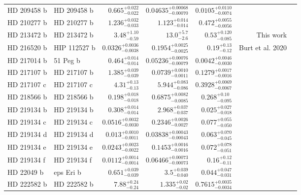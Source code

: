 \begin{longtable*}{llrrrrr}
HD 209458 b & HD 209458 b & $0.665^{+0.022}_{-0.022}$ & $0.04635^{+0.00068}_{-0.00070}$ & $0.0105^{+0.0110}_{-0.0074}$ & \cite{Henry00} & \\
HD 210277 b & HD 210277 b & $1.236^{+0.032}_{-0.033}$ & $1.123^{+0.014}_{-0.014}$ & $0.472^{+0.0055}_{-0.0056}$ & \cite{Marcy99} & \\
HD 213472 b & HD 213472 b & $3.48^{+1.10}_{-0.59}$ & $13.0^{+5.7}_{-2.6}$ & $0.53^{+0.120}_{-0.085}$ & This work & \\
HD 216520 b & HIP 112527 b & $0.0326^{+0.0036}_{-0.0038}$ & $0.1954^{+0.0025}_{-0.0025}$ & $0.19^{+0.13}_{-0.12}$ & Burt et al. 2020 & \\
HD 217014 b & 51 Peg b & $0.464^{+0.014}_{-0.014}$ & $0.05236^{+0.00076}_{-0.00079}$ & $0.0042^{+0.0046}_{-0.0030}$ & \cite{Mayor95} & \\
HD 217107 b & HD 217107 b & $1.385^{+0.039}_{-0.039}$ & $0.0739^{+0.0010}_{-0.0011}$ & $0.1279^{+0.0017}_{-0.0016}$ & \cite{Fischer99} & \\
HD 217107 c & HD 217107 c & $4.31^{+0.13}_{-0.13}$ & $5.944^{+0.083}_{-0.086}$ & $0.3928^{+0.0069}_{-0.0067}$ & \cite{Vogt05} & \\
HD 218566 b & HD 218566 b & $0.198^{+0.018}_{-0.018}$ & $0.6875^{+0.0082}_{-0.0085}$ & $0.268^{+0.10}_{-0.095}$ & \cite{Meschiari11} & \\
HD 219134 b & HD 219134 b & $0.308^{+0.014}_{-0.014}$ & $2.968^{+0.037}_{-0.037}$ & $0.025^{+0.027}_{-0.018}$ & \cite{Vogt15} & \\
HD 219134 c & HD 219134 c & $0.0516^{+0.0032}_{-0.0030}$ & $0.2346^{+0.0026}_{-0.0027}$ & $0.077^{+0.055}_{-0.050}$ & \cite{Vogt15} & \\
HD 219134 d & HD 219134 d & $0.013^{+0.0010}_{-0.0011}$ & $0.03838^{+0.00043}_{-0.00043}$ & $0.063^{+0.070}_{-0.045}$ & \cite{Vogt15} & \\
HD 219134 e & HD 219134 e & $0.0243^{+0.0023}_{-0.0022}$ & $0.1453^{+0.0016}_{-0.0016}$ & $0.072^{+0.078}_{-0.051}$ & \cite{Vogt15} & \\
HD 219134 f & HD 219134 f & $0.0112^{+0.0014}_{-0.0014}$ & $0.06466^{+0.00073}_{-0.00073}$ & $0.16^{+0.12}_{-0.11}$ & \cite{Vogt15} & \\
HD 22049 b & eps Eri b & $0.651^{+0.039}_{-0.039}$ & $3.5^{+0.039}_{-0.040}$ & $0.044^{+0.047}_{-0.031}$ & \cite{Hatzes00} & \\
HD 222582 b & HD 222582 b & $7.88^{+0.24}_{-0.24}$ & $1.335^{+0.02}_{-0.02}$ & $0.7615^{+0.0035}_{-0.0034}$ & \cite{Vogt00} & \\

\end{longtable*}
